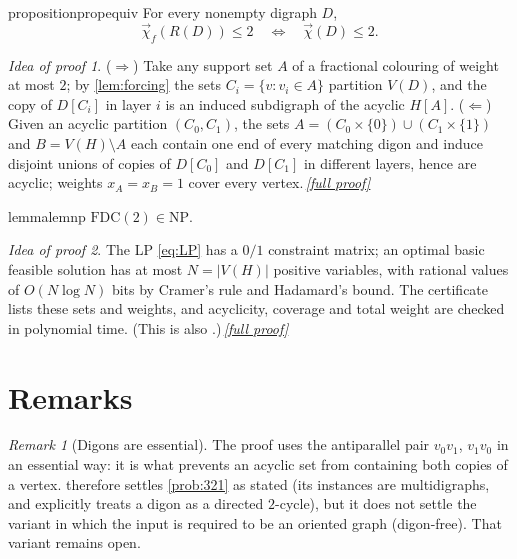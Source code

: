 \documentclass[11pt,a4paper]{article}
\theoremstyle{plain}
\theoremstyle{definition}
\theoremstyle{remark}
\newtheorem{remark}[theorem]{Remark}
\newtheorem*{proofidea}{Idea of proof}
\newcommand{\fullproofref}[1]{\,\hyperref[#1]{\textit{[full proof]}}}
\newcommand{\fdc}{\vec{\chi}_{f}}
\newcommand{\dic}{\vec{\chi}}
\newcommand{\FDC}{\mathrm{FDC}}
\newcommand{\NP}{\mathrm{NP}}
\begin{document}
\begin{restatable}{proposition}{propequiv}\label{prop:equiv}
For every nonempty digraph $D$,
\[
 \fdc(R(D))\le2\quad\Longleftrightarrow\quad\dic(D)\le2 .
\]
\end{restatable}
\begin{proofidea}
($\Rightarrow$) Take any support set $A$ of a fractional colouring of weight at most $2$; by \cref{lem:forcing} the sets $C_i=\{v:v_i\in A\}$ partition $V(D)$, and the copy of $D[C_i]$ in layer $i$ is an induced subdigraph of the acyclic $H[A]$. ($\Leftarrow$) Given an acyclic partition $(C_0,C_1)$, the sets $A=(C_0\times\{0\})\cup(C_1\times\{1\})$ and $B=V(H)\setminus A$ each contain one end of every matching digon and induce disjoint unions of copies of $D[C_0]$ and $D[C_1]$ in different layers, hence are acyclic; weights $x_A=x_B=1$ cover every vertex.\fullproofref{pf:equiv}
\end{proofidea}

\begin{restatable}[Membership in NP]{lemma}{lemnp}\label{lem:np}
$\FDC(2)\in\NP$.
\end{restatable}
\begin{proofidea}
The LP \eqref{eq:LP} has a $0/1$ constraint matrix; an optimal basic feasible solution has at most $N=|V(H)|$ positive variables, with rational values of $O(N\log N)$ bits by Cramer's rule and Hadamard's bound. The certificate lists these sets and weights, and acyclicity, coverage and total weight are checked in polynomial time. (This is also \cite[Observation~3.15]{HSS20}.)\fullproofref{pf:np}
\end{proofidea}

\section{Remarks}\label{sec:remarks}

\begin{remark}[Digons are essential]\label{rem:digons}
The proof uses the antiparallel pair $v_0v_1$, $v_1v_0$ in an essential way: it is what prevents an acyclic set from containing both copies of a vertex.  therefore settles \cref{prob:321} as stated (its instances are multidigraphs, and \cite{HSS20} explicitly treats a digon as a directed $2$-cycle), but it does not settle the variant in which the input is required to be an oriented graph (digon-free). That variant remains open.
\end{remark}
\end{document}
